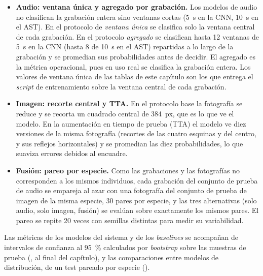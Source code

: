 \begin{itemize}[leftmargin=*, itemsep=2pt]
  \item \textbf{Audio: ventana única y agregado por grabación.} Los modelos
        de audio no clasifican la grabación entera sino ventanas cortas
        (\SI{5}{\second} en la CNN, \SI{10}{\second} en el AST). En el
        protocolo de \emph{ventana única} se clasifica solo la ventana central
        de cada grabación. En el protocolo \emph{agregado} se clasifican hasta
        12 ventanas de \SI{5}{\second} en la CNN (hasta 8 de \SI{10}{\second}
        en el AST) repartidas a lo largo de la grabación y se promedian sus
        probabilidades antes de decidir. El agregado es la métrica
        operacional, pues en uso real se clasifica la grabación entera. Los
        valores de ventana única de las tablas de este capítulo son los que
        entrega el \textit{script} de entrenamiento sobre la ventana central
        de cada grabación.
  \item \textbf{Imagen: recorte central y TTA.} En el protocolo base la
        fotografía se reduce y se recorta un cuadrado central de \SI{384}{px},
        que es lo que ve el modelo. En la aumentación en tiempo de prueba
        (TTA) el modelo ve diez versiones de la misma fotografía (recortes de
        las cuatro esquinas y del centro, y sus reflejos horizontales) y se
        promedian las diez probabilidades, lo que suaviza errores debidos al
        encuadre.
  \item \textbf{Fusión: pareo por especie.} Como las grabaciones y las
        fotografías no corresponden a los mismos individuos, cada grabación
        del conjunto de prueba de audio se empareja al azar con una fotografía
        del conjunto de prueba de imagen de la misma especie, 30 pares por
        especie, y las tres alternativas (solo audio, solo imagen, fusión) se
        evalúan sobre exactamente los mismos pares. El pareo se repite 20
        veces con semillas distintas para medir su variabilidad.
\end{itemize}

Las métricas de los modelos del sistema y de los \textit{baselines} se
acompañan de intervalos de confianza al
\SI{95}{\percent} calculados por \textit{bootstrap} sobre las muestras de
prueba (, al final del capítulo), y las comparaciones entre
modelos de distribución, de un test pareado por especie
().

